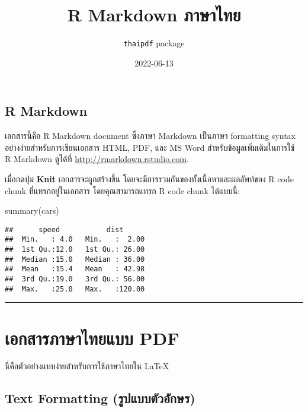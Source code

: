 \documentclass[
]{article}
\title{R Markdown ภาษาไทย}
\author{\texttt{thaipdf} package}
\date{2022-06-13}
\newenvironment{Shaded}{\begin{snugshade}}{\end{snugshade}}
\newcommand{\FunctionTok}[1]{\textcolor[rgb]{0.00,0.00,0.00}{#1}}
\newcommand{\NormalTok}[1]{#1}
\begin{document}
\maketitle

\sloppy %

\hypertarget{r-markdown}{%
\subsection{R Markdown}\label{r-markdown}}

เอกสารนี้คือ R Markdown document ซึ่งภาษา Markdown เป็นภาษา formatting
syntax อย่างง่ายสำหรับการเขียนเอกสาร HTML, PDF, และ MS Word
สำหรับข้อมูลเพิ่มเติมในการใช้ R Markdown ดูได้ที่
\url{http://rmarkdown.rstudio.com}.

เมื่อกดปุ่ม \textbf{Knit} เอกสารจะถูกสร้างขึ้น
โดยจะมีการรวมกันของทั้งเนื้อหาและผลลัพท์ของ R code chunk
ที่แทรกอยู่ในเอกสาร โดยคุณสามารถแทรก R code chunk ได้แบบนี้:

\begin{Shaded}
\begin{Highlighting}[]
\FunctionTok{summary}\NormalTok{(cars)}
\end{Highlighting}
\end{Shaded}

\begin{verbatim}
##      speed           dist       
##  Min.   : 4.0   Min.   :  2.00  
##  1st Qu.:12.0   1st Qu.: 26.00  
##  Median :15.0   Median : 36.00  
##  Mean   :15.4   Mean   : 42.98  
##  3rd Qu.:19.0   3rd Qu.: 56.00  
##  Max.   :25.0   Max.   :120.00
\end{verbatim}

\begin{center}\rule{0.5\linewidth}{0.5pt}\end{center}

\hypertarget{uxe40uxe2duxe01uxe2auxe32uxe23uxe20uxe32uxe29uxe32uxe44uxe17uxe22uxe41uxe1auxe1a-pdf}{%
\section{เอกสารภาษาไทยแบบ
PDF}\label{uxe40uxe2duxe01uxe2auxe32uxe23uxe20uxe32uxe29uxe32uxe44uxe17uxe22uxe41uxe1auxe1a-pdf}}

นี่คือตัวอย่างแบบง่ายสำหรับการใช้ภาษาไทยใน \LaTeX

\hypertarget{text-formatting-uxe23uxe1buxe41uxe1auxe1auxe15uxe27uxe2duxe01uxe29uxe23}{%
\subsection{Text Formatting
(รูปแบบตัวอักษร)}\label{text-formatting-uxe23uxe1buxe41uxe1auxe1auxe15uxe27uxe2duxe01uxe29uxe23}}
\end{document}
